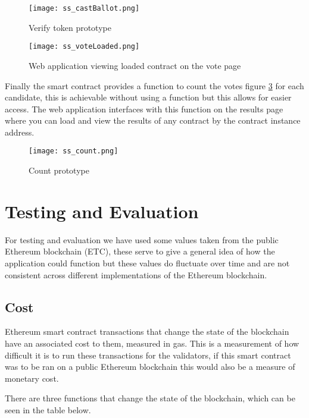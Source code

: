 \documentclass{entcs}
\begin{document}
\begin{figure}[h!]
    \centering
    \texttt{[image: ss\_castBallot.png]}
    \caption{Verify token prototype}
    \label{fig:castBallot}
\end{figure}

\begin{figure}[h!]
    \centering
    \texttt{[image: ss\_voteLoaded.png]}
    \caption{Web application viewing loaded contract on the vote page}
    \label{fig:vote_loaded}
\end{figure}

Finally the smart contract provides a function to count the votes figure \ref{fig:count} for each candidate, this is achievable without using a function but this allows for easier access. The web application interfaces with this function on the results page where you can load and view the results of any contract by the contract instance address.


\begin{figure}[h!]
    \centering
    \texttt{[image: ss\_count.png]}
    \caption{Count prototype}
    \label{fig:count}
\end{figure}

\pagebreak
\section{Testing and Evaluation}
For testing and evaluation we have used some values taken from the public Ethereum blockchain (ETC), these serve to give a general idea of how the application could function but these values do fluctuate over time and are not consistent across different implementations of the Ethereum blockchain.

\subsection{Cost} \label{sec: cost}
Ethereum smart contract transactions that change the state of the blockchain have an associated cost to them, measured in gas. This is a measurement of how difficult it is to run these transactions for the validators, if this smart contract was to be ran on a public Ethereum blockchain this would also be a measure of monetary cost. 

There are three functions that change the state of the blockchain, which can be seen in the table below.
\end{document}
